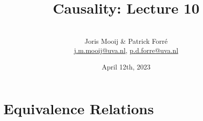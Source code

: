 \title[Causality]{Causality: Lecture 10}
\author[Joris Mooij]{\\[5mm]\large Joris Mooij \& Patrick Forr\'e\\
\url{j.m.mooij@uva.nl}, \url{p.d.forre@uva.nl}}
\date[2022-04-12]{\normalsize April 12th, 2023}
\maketitle


\part{Equivalence Relations}
\frame{\partpage}


